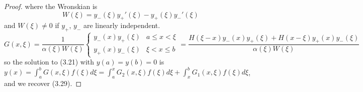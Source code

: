 \documentclass[a4paper]{article}
\begin{document}
\begin{proof}
where the Wronskian is
$$W(\xi)=y_-(\xi)y_+'(\xi)-y_+(\xi)y_-'(\xi)$$
and $W(\xi)\neq 0$ if $y_+$, $y_-$ are linearly independent.
\begin{equation}
    G(x,\xi)=\frac{1}{\alpha(\xi)W(\xi)}\left\{
        \begin{array}{ll}
      y_-(x)y_+(\xi) & a\leq x<\xi\\
      y_+(x)y_-(\xi) & \xi<x\leq b
        \end{array}
    \right.=\frac{H(\xi-x)y_-(x)y_+(\xi)+H(x-\xi)y_+(x)y_-(\xi)}{\alpha(\xi)W(\xi)}\tag{3.18}
\end{equation}
so the solution to (3.21) with $y(a)=y(b)=0$ is $y(x)=\int_a^bG(x,\xi)f(\xi)d\xi=\int_a^xG_2(x,\xi)f(\xi)d\xi+\int_x^bG_1(x,\xi)f(\xi)d\xi$, and we recover (3.29).
\end{proof}
\end{document}
